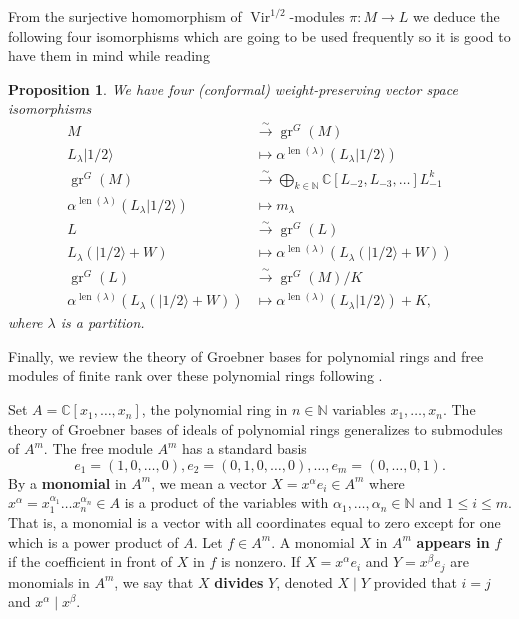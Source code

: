 \documentclass[12pt,a4paper]{article}
\newtheorem{proposition}{Proposition}
\DeclareMathOperator{\Vir}{Vir}
\DeclareMathOperator{\gr}{gr}
\DeclareMathOperator{\len}{len}
\newcommand{\vachalf}{|1/2\rangle}
\begin{document}
From the surjective homomorphism of $\Vir^{1/2}$-modules $\pi:M\to L$ we deduce the following four isomorphisms which are going to be used frequently so it is good to have them in mind while reading
\begin{proposition}
  \label{prp:6}
  We have four (conformal) weight-preserving vector space isomorphisms
  \begin{align*}
    M&\xrightarrow{\sim} \gr^G(M) \\
    L_\lambda\vachalf&\mapsto \alpha^{\len(\lambda)}(L_\lambda\vachalf) \\
    \gr^G(M)&\xrightarrow{\sim}\bigoplus_{k\in \mathbb{N}}\mathbb{C}[L_{-2},L_{-3},\dots]L_{-1}^k \\
    \alpha^{\len(\lambda)}(L_\lambda\vachalf)&\mapsto m_\lambda \\
    L&\xrightarrow{\sim} \gr^G(L) \\
    L_\lambda(\vachalf+W)&\mapsto \alpha^{\len(\lambda)}(L_\lambda(\vachalf+W)) \\
    \gr^G(L)&\xrightarrow{\sim} \gr^G(M)/K \\
    \alpha^{\len(\lambda)}(L_\lambda(\vachalf+W))&\mapsto \alpha^{\len(\lambda)}(L_\lambda\vachalf)+K,
  \end{align*}
  where $\lambda$ is a partition.
\end{proposition}

Finally, we review the theory of Groebner bases for polynomial rings and free modules of finite rank over these polynomial rings following \cite{adams_introduction_1994}.

Set $A=\mathbb{C}[x_1,\dots,x_n]$, the polynomial ring in $n\in \mathbb{N}$ variables $x_1,\dots, x_n$.
The theory of Groebner bases of ideals of polynomial rings generalizes to submodules of $A^m$.
The free module $A^m$ has a standard basis
\begin{equation*}
  e_1=(1,0,\dots,0), e_2=(0,1,0,\dots, 0), \dots, e_m=(0,\dots, 0, 1).
\end{equation*}
By a \textbf{monomial} in $A^m$, we mean a vector $X=x^\alpha e_i\in A^m$ where $x^\alpha=x_1^{\alpha_1}\dots x_n^{\alpha_n}\in A$ is a product of the variables with $\alpha_1,\dots,\alpha_n\in \mathbb{N}$ and $1\le i \le m$.
That is, a monomial is a vector with all coordinates equal to zero except for one which is a power product of $A$.
Let $f\in A^m$.
A monomial $X$ in $A^m$ \textbf{appears in} $f$ if the coefficient in front of $X$ in $f$ is nonzero.
If $X=x^\alpha e_i$ and $Y=x^\beta e_j$ are monomials in $A^m$, we say that $X$ \textbf{divides} $Y$, denoted $X\mid Y$ provided that $i=j$ and $x^\alpha\mid x^\beta$.
\end{document}
